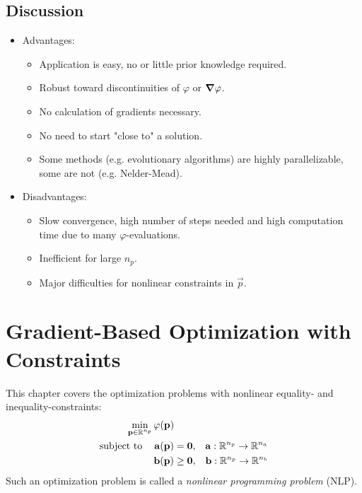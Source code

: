 	\section{Discussion}
		\begin{itemize}
			\item Advantages:
				\begin{itemize}
					\item Application is easy, no or little prior knowledge required.
					\item Robust toward discontinuities of \(\varphi\) or \(\grad{\varphi}\).
					\item No calculation of gradients necessary.
					\item No need to start "close to" a solution.
					\item Some methods (e.g. evolutionary algorithms) are highly parallelizable, some are not (e.g. Nelder-Mead).
				\end{itemize}
			\item Disadvantages:
				\begin{itemize}
					\item Slow convergence, high number of steps needed and high computation time due to many \(\varphi\)-evaluations.
					\item Inefficient for large \( n_p \).
					\item Major difficulties for nonlinear constraints in \(\vec{p}\).
				\end{itemize}
		\end{itemize}

\chapter{Gradient-Based Optimization with Constraints}
	This chapter covers the optimization problems with nonlinear equality- and inequality-constraints:
	\begin{align*}
		\min_{\boldsymbol{\mathrm{p}} \in \mathbb{R}^{n_p}} &\, \varphi(\boldsymbol{\mathrm{p}}) \\
		\mathrm{subject~to}\quad &\,
			\begin{alignedat}[t]{3}
				\boldsymbol{\mathrm{a}}(\boldsymbol{\mathrm{p}}) &= \boldsymbol{\mathrm{0}},\quad & \boldsymbol{\mathrm{a}} : \mathbb{R}^{n_p} \to \mathbb{R}^{n_a} \\
				\boldsymbol{\mathrm{b}}(\boldsymbol{\mathrm{p}}) &\geq \boldsymbol{\mathrm{0}},\quad & \boldsymbol{\mathrm{b}} : \mathbb{R}^{n_p} \to \mathbb{R}^{n_b}
			\end{alignedat}
	\end{align*}
	Such an optimization problem is called a \emph{nonlinear programming problem} (NLP).
	
